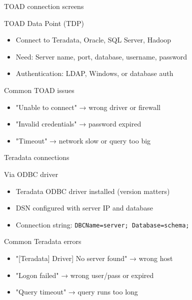 \documentclass[aspectratio=169, 11pt]{beamer}
\begin{document}
	\begin{frame}{TOAD connection screens}
		\tiny
		\begin{block}{TOAD Data Point (TDP)}
			\begin{itemize}
				\item Connect to Teradata, Oracle, SQL Server, Hadoop
				\item Need: Server name, port, database, username, password
				\item Authentication: LDAP, Windows, or database auth
			\end{itemize}
		\end{block}
		\vspace{0.03cm}
		\begin{block}{Common TOAD issues}
			\tiny
			\begin{itemize}
				\item "Unable to connect" → wrong driver or firewall
				\item "Invalid credentials" → password expired
				\item "Timeout" → network slow or query too big
			\end{itemize}
		\end{block}
	\end{frame}
	
	\begin{frame}{Teradata connections}
		\tiny
		\begin{block}{Via ODBC driver}
			\begin{itemize}
				\item Teradata ODBC driver installed (version matters)
				\item DSN configured with server IP and database
				\item Connection string: \texttt{DBCName=server; Database=schema;}
			\end{itemize}
		\end{block}
		\begin{block}{Common Teradata errors}
			\tiny
			\begin{itemize}
				\item "[Teradata] Driver] No server found" → wrong host
				\item "Logon failed" → wrong user/pass or expired
				\item "Query timeout" → query runs too long
			\end{itemize}
		\end{block}
	\end{frame}
	
\end{document}
